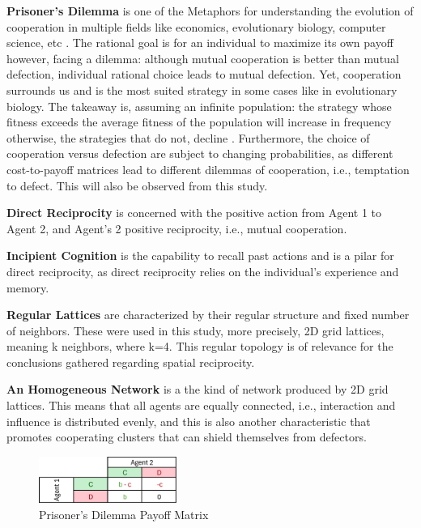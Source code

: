 \documentclass[runningheads]{llncs}
\begin{document}
\textbf{Prisoner's Dilemma} is one of the Metaphors for understanding the evolution of cooperation
in multiple fields like economics, evolutionary biology, computer science, etc \cite{mm2024}.
The rational goal is for an individual to maximize its own payoff however, facing a
dilemma: although mutual cooperation is better than mutual defection, individual rational
choice leads to mutual defection. Yet, cooperation surrounds us and is the most suited
strategy in some cases like in evolutionary biology. The takeaway is, assuming
an infinite population: the strategy whose fitness exceeds the average fitness
of the population will increase in frequency otherwise, the strategies that do not,
decline \cite{mm2024}. Furthermore, the choice of cooperation versus defection are
subject to changing probabilities, as different cost-to-payoff matrices lead to
different dilemmas of cooperation, i.e., temptation to defect.
This will also be observed from this study.

\textbf{Direct Reciprocity} is concerned with the positive action from Agent 1
to Agent 2, and Agent's 2 positive reciprocity, i.e., mutual cooperation.

\textbf{Incipient Cognition} is the capability to recall past actions and is
a pilar for direct reciprocity, as direct reciprocity
relies on the individual's experience and memory.

\textbf{Regular Lattices} are characterized by their regular structure and fixed
number of neighbors. These were used in this study, more precisely,
2D grid lattices, meaning k neighbors, where k=4. This regular topology is of relevance
for the conclusions gathered regarding spatial reciprocity.

\textbf{An Homogeneous Network} is a the kind of network produced by 2D
grid lattices. This means that all agents are equally connected, i.e.,
interaction and influence is distributed evenly, and this is also
another characteristic that promotes cooperating clusters that can shield themselves
from defectors.

\begin{figure}[htbp]
    \centering
    \includegraphics[width=0.4\textwidth]{payoffmatrix.png}
    \caption{Prisoner's Dilemma Payoff Matrix}
    \label{fig:coop_vs_b}
\end{figure}
\end{document}
